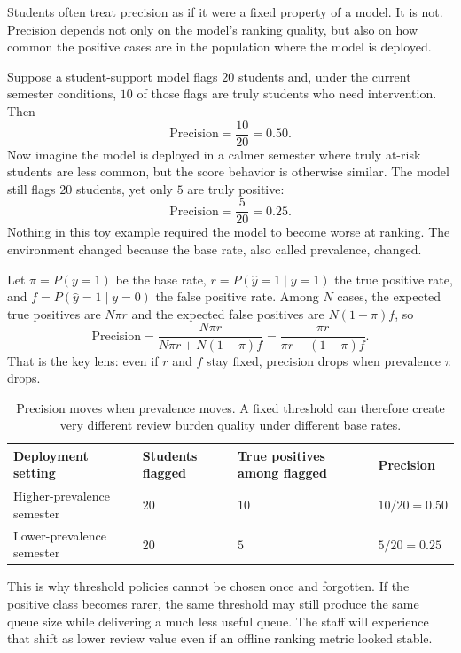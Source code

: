 Students often treat precision as if it were a fixed property of a model. It is not. Precision depends not only on the model's ranking quality, but also on how common the positive cases are in the population where the model is deployed.

Suppose a student-support model flags $20$ students and, under the current semester conditions, $10$ of those flags are truly students who need intervention. Then
\[
\text{Precision} = \frac{10}{20} = 0.50.
\]
Now imagine the model is deployed in a calmer semester where truly at-risk students are less common, but the score behavior is otherwise similar. The model still flags $20$ students, yet only $5$ are truly positive:
\[
\text{Precision} = \frac{5}{20} = 0.25.
\]
Nothing in this toy example required the model to become worse at ranking. The environment changed because the base rate, also called prevalence, changed.

\begin{mathlens}
Let $\pi=P(y=1)$ be the base rate, $r=P(\hat y=1\mid y=1)$ the true positive rate, and $f=P(\hat y=1\mid y=0)$ the false positive rate. Among $N$ cases, the expected true positives are $N\pi r$ and the expected false positives are $N(1-\pi)f$, so
\[
\text{Precision}
=\frac{N\pi r}{N\pi r+N(1-\pi)f}
=\frac{\pi r}{\pi r+(1-\pi)f}.
\]
That is the key lens: even if $r$ and $f$ stay fixed, precision drops when prevalence $\pi$ drops.
\end{mathlens}

\begin{table}[t]
\centering
\small
\setlength{\tabcolsep}{4pt}
\begin{tabular}{p{3.05cm}p{1.78cm}p{1.78cm}p{3.05cm}}
\toprule
Deployment setting & Students flagged & True positives among flagged & Precision \\
\midrule
Higher-prevalence semester & $20$ & $10$ & $10/20 = 0.50$ \\
Lower-prevalence semester & $20$ & $5$ & $5/20 = 0.25$ \\
\bottomrule
\end{tabular}
\caption{Precision moves when prevalence moves. A fixed threshold can therefore create very different review burden quality under different base rates.}
\label{tab:base-rate-precision}
\end{table}

This is why threshold policies cannot be chosen once and forgotten. If the positive class becomes rarer, the same threshold may still produce the same queue size while delivering a much less useful queue. The staff will experience that shift as lower review value even if an offline ranking metric looked stable.

